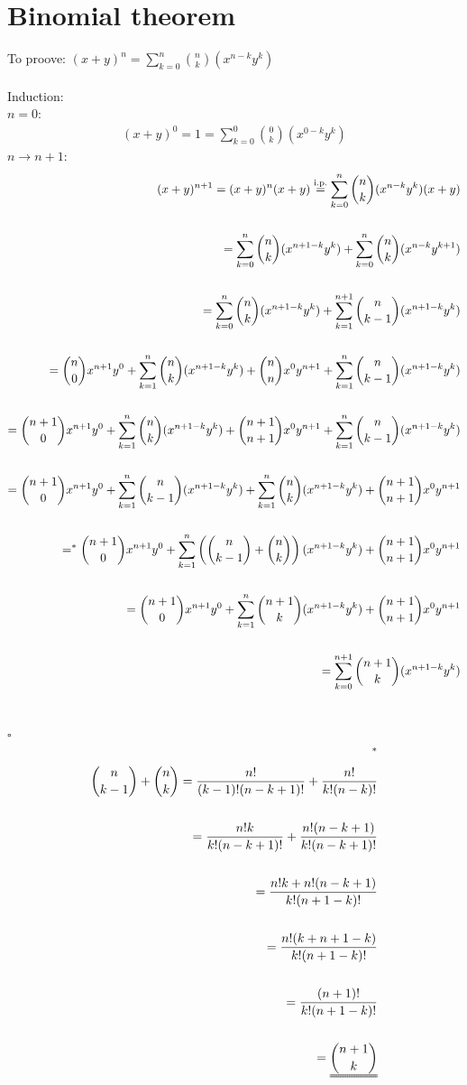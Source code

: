 \documentclass[a4paper]{article}
\begin{document}
\section{Binomial theorem}
To proove: $(x+y)^n=\sum_{k=0}^{n}{n \choose k}(x^{n-k}y^k)$
\\\\
Induction:\\
$n=0$:
\begin{align*}
(x+y)^0=1=\sum_{k=0}^{0}{0 \choose k}(x^{0-k}y^k)
\end{align*}
$n \to n+1$:
\begin{align*}
(x+y)^{n+1}=(x+y)^n(x+y)\stackrel{\textnormal{i.p.}}{=}\sum_{k=0}^{n}{n \choose k}(x^{n-k}y^{k})(x+y)
\\\\
=\sum_{k=0}^{n}{n \choose k}(x^{n+1-k}y^k)+\sum_{k=0}^{n}{n \choose k}(x^{n-k}y^{k+1})
\\\\
=\sum_{k=0}^{n}{n \choose k}(x^{n+1-k}y^k)+\sum_{k=1}^{n+1}{n \choose k-1}(x^{n+1-k}y^{k})
\\\\
={n \choose 0}x^{n+1}y^0+\sum_{k=1}^{n}{n \choose k}(x^{n+1-k}y^k)+{n \choose n}x^0y^{n+1}+\sum_{k=1}^{n}{n \choose k-1}(x^{n+1-k}y^k)
\\\\
={n+1 \choose 0}x^{n+1}y^0+\sum_{k=1}^{n}{n \choose k}(x^{n+1-k}y^k)+{n+1 \choose n+1}x^0y^{n+1}+\sum_{k=1}^{n}{n \choose k-1}(x^{n+1-k}y^k)
\\\\
={n+1 \choose 0}x^{n+1}y^0+\sum_{k=1}^{n}{n \choose k-1}(x^{n+1-k}y^k)+\sum_{k=1}^{n}{n \choose k}(x^{n+1-k}y^k)+{n+1 \choose n+1}x^0y^{n+1}
\\\\
=^*{n+1 \choose 0}x^{n+1}y^0+\sum_{k=1}^{n}\left({n \choose k-1}+{n \choose k}\right)(x^{n+1-k}y^k)+{n+1 \choose n+1}x^0y^{n+1}
\\\\
={n+1 \choose 0}x^{n+1}y^0+\sum_{k=1}^{n}{n+1 \choose k}(x^{n+1-k}y^k)+{n+1 \choose n+1}x^0y^{n+1}
\\\\
=\sum_{k=0}^{n+1}{n+1 \choose k}(x^{n+1-k}y^k)
\end{align*}
\\\\
$\square$
\newpage
\begin{align*}
^*
\\
{n \choose k-1}+{n \choose k}=\frac{n!}{(k-1)!(n-k+1)!}+\frac{n!}{k!(n-k)!}
\\\\
=\frac{n!k}{k!(n-k+1)!}+\frac{n!(n-k+1)}{k!(n-k+1)!}
\\\\
=\frac{n!k+n!(n-k+1)}{k!(n+1-k)!}
\\\\
=\frac{n!(k+n+1-k)}{k!(n+1-k)!}
\\\\
=\frac{(n+1)!}{k!(n+1-k)!}
\\\\
=\uuline{{n+1 \choose k}}
\end{align*}
\newpage
\end{document}
